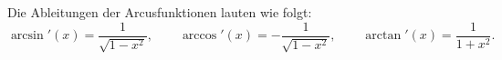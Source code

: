 Die Ableitungen der Arcusfunktionen lauten wie folgt:
$$
\arcsin'(x) = \frac{1}{\sqrt{1-x^2}},
\qquad
\arccos'(x) = -\frac{1}{\sqrt{1-x^2}},
\qquad
\arctan'(x) = \frac{1}{1+x^2}.
$$